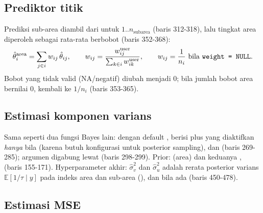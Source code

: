 \subsection{Prediktor titik}\label{sec:hbtwofold-prediktor}

Prediksi sub-area diambil dari  untuk
$1..n_{\text{subarea}}$ (baris 312-318), lalu tingkat area diperoleh sebagai
rata-rata berbobot (baris 352-368):
\begin{equation}
  \hat\theta^{\text{area}}_i=\sum_{j\in i}w_{ij}\,\hat\theta_{ij},
  \qquad
  w_{ij}=\frac{w_{ij}^{\text{user}}}{\sum_{k\in i}w_{ik}^{\text{user}}},
  \qquad w_{ij}=\frac1{n_i}\ \text{bila \texttt{weight = NULL}}.
  \label{eq:hbtwofold-area}
\end{equation}
Bobot yang tidak valid (NA/negatif) diubah menjadi $0$; bila jumlah bobot
area bernilai $0$, kembali ke $1/n_i$ (baris 353-365).

\subsection{Estimasi komponen varians}\label{sec:hbtwofold-varians}

Sama seperti dua fungsi Bayes lain:  dengan
 default ,  berisi
 plus  yang diaktifkan \emph{hanya}
bila  (karena butuh konfigurasi untuk posterior
sampling), dan  (baris 269-285); argumen
 digabung lewat  (baris 298-299).
Prior:  (area) dan  keduanya
,  
(baris 155-171). Hyperparameter akhir: $\hat\sigma_v^2$ dan $\hat\sigma_u^2$
adalah rerata posterior varians $\mathbb E[1/\tau\mid y]$ pada indeks area dan
sub-area (), dan  bila ada (baris
450-478).

\subsection{Estimasi MSE}\label{sec:hbtwofold-mse}


